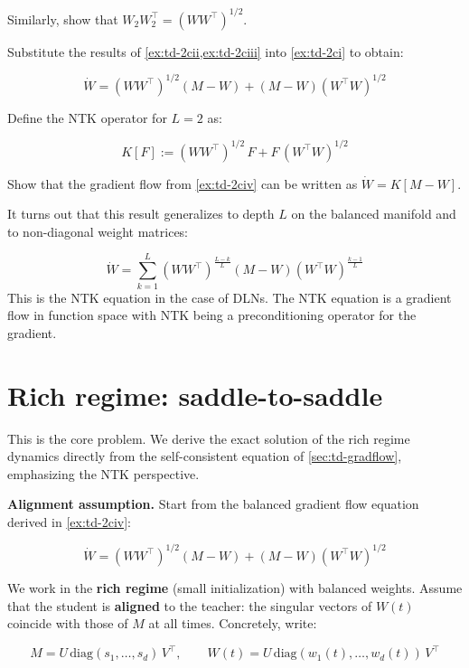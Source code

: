 \documentclass[11pt]{article}
\begin{document}
\begin{exercise}
\label{ex:td-2ciii}
Similarly, show that
\(W_2 W_2^\top = (W W^\top)^{1/2}\).
\end{exercise}


\begin{exercise}
\label{ex:td-2civ}
Substitute the results of \cref{ex:td-2cii,ex:td-2ciii} into \cref{ex:td-2ci}
to obtain:

\[\dot{W} = (W W^\top)^{1/2}(M - W) + (M - W)(W^\top W)^{1/2}\]
\end{exercise}


\begin{exercise}
\label{ex:td-2d}
Define the NTK operator for \(L = 2\) as:

\[K[F] := (WW^\top)^{1/2}\, F + F\, (W^\top W)^{1/2}\]

Show that the gradient flow from \cref{ex:td-2civ} can be written as
\(\dot{W} = K[M - W]\).

It turns out that this result generalizes to depth \(L\) on the balanced
manifold and to non-diagonal weight matrices:

\[\dot{W} = \sum_{k=1}^{L} (WW^\top)^{\frac{L-k}{L}} (M - W) (W^\top W)^{\frac{k-1}{L}}\]
This is the NTK equation in the case of DLNs. The NTK equation is a gradient flow in function space with NTK being a preconditioning operator for the gradient.
\end{exercise}


\section{Rich regime: saddle-to-saddle}
\label{sec:td-rich}

This is the core problem. We derive the exact solution of the rich
regime dynamics directly from the self-consistent equation of \cref{sec:td-gradflow},
emphasizing the NTK perspective.

\textbf{Alignment assumption.} Start from the balanced
gradient flow equation derived in \cref{ex:td-2civ}:

\[\dot{W} = (WW^\top)^{1/2}(M - W) + (M - W)(W^\top W)^{1/2}\]

We work in the \textbf{rich regime} (small initialization) with balanced
weights. Assume that the student is \textbf{aligned} to the teacher: the
singular vectors of \(W(t)\) coincide with those of \(M\) at all times.
Concretely, write:

\[M = U\,\text{diag}(s_1, \ldots, s_d)\,V^\top, \qquad W(t) = U\,\text{diag}(w_1(t), \ldots, w_d(t))\,V^\top\]
\end{document}
